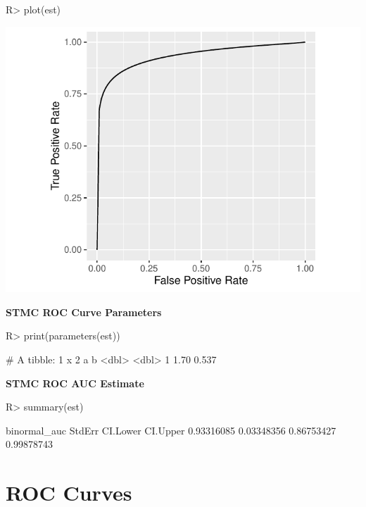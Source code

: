 \documentclass[
]{jss}
\begin{document}
\begin{CodeChunk}
\begin{CodeInput}
R> plot(est)
\end{CodeInput}


\begin{center}\includegraphics{MRMCaov_files/figure-latex/unnamed-chunk-28-1} \end{center}

\end{CodeChunk}

\textbf{STMC ROC Curve Parameters}

\begin{CodeChunk}
\begin{CodeInput}
R> print(parameters(est))
\end{CodeInput}
\begin{CodeOutput}
# A tibble: 1 x 2
      a     b
  <dbl> <dbl>
1  1.70 0.537
\end{CodeOutput}
\end{CodeChunk}

\textbf{STMC ROC AUC Estimate}

\begin{CodeChunk}
\begin{CodeInput}
R> summary(est)
\end{CodeInput}
\begin{CodeOutput}
binormal_auc       StdErr     CI.Lower     CI.Upper 
  0.93316085   0.03348356   0.86753427   0.99878743 
\end{CodeOutput}
\end{CodeChunk}

\hypertarget{roc-curves}{%
\section{ROC Curves}\label{roc-curves}}
\end{document}
